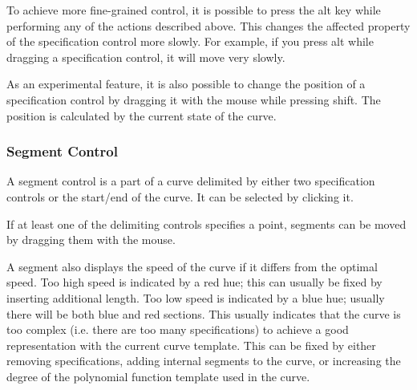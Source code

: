 \documentclass[a4paper]{article}
\begin{document}
					To achieve more fine-grained control, it is possible to press the alt key while performing any of the actions described above. This changes the affected property of the specification control more slowly. For example, if you press alt while dragging a specification control, it will move very slowly.
					
					As an experimental feature, it is also possible to change the position of a specification control by dragging it with the mouse while pressing shift. The position is calculated by the current state of the curve.
				
				\subsubsection{Segment Control}
				
					A segment control is a part of a curve delimited by either two specification controls or the start/end of the curve. It can be selected by clicking it.
					
					If at least one of the delimiting controls specifies a point, segments can be moved by dragging them with the mouse.
					
					A segment also displays the speed of the curve if it differs from the optimal speed. Too high speed is indicated by a red hue; this can usually be fixed by inserting additional length. Too low speed is indicated by a blue hue; usually there will be both blue and red sections. This usually indicates that the curve is too complex (i.e. there are too many specifications) to achieve a good representation with the current curve template. This can be fixed by either removing specifications, adding internal segments to the curve, or increasing the degree of the polynomial function template used in the curve.
				
\end{document}
